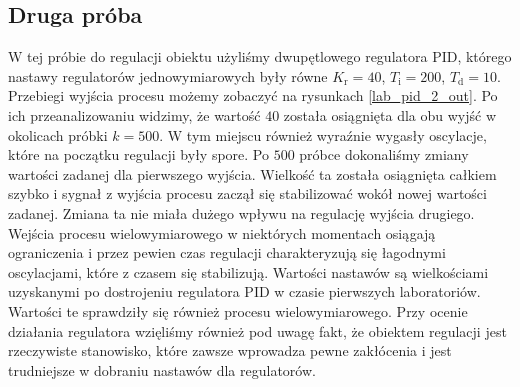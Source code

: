 \subsection{Druga próba}
\label{thermal_pid_proba_2}
W tej próbie do regulacji obiektu użyliśmy dwupętlowego regulatora PID, którego nastawy regulatorów jednowymiarowych były równe $K_{\mathrm{r}} = 40$, $T_{\mathrm{i}} = 200$, $ T_{\mathrm{d}} = 10$. Przebiegi wyjścia procesu możemy zobaczyć na rysunkach \ref{lab_pid_2_out}. Po ich przeanalizowaniu widzimy, że wartość $40$ została osiągnięta dla obu wyjść w okolicach próbki $k=500$. W tym miejscu również wyraźnie wygasły oscylacje, które na początku regulacji były spore. Po $500$ próbce dokonaliśmy zmiany wartości zadanej dla pierwszego wyjścia. Wielkość ta została osiągnięta całkiem szybko i sygnał z wyjścia procesu zaczął się stabilizować wokół nowej wartości zadanej. Zmiana ta nie miała dużego wpływu na regulację wyjścia drugiego. Wejścia procesu wielowymiarowego w niektórych momentach osiągają ograniczenia i przez pewien czas regulacji charakteryzują się łagodnymi oscylacjami, które z czasem się stabilizują. Wartości nastawów są wielkościami uzyskanymi po dostrojeniu regulatora PID w czasie pierwszych laboratoriów. Wartości te sprawdziły się również procesu wielowymiarowego. Przy ocenie działania regulatora wzięliśmy również pod uwagę fakt, że obiektem regulacji jest rzeczywiste stanowisko, które zawsze wprowadza pewne zakłócenia i jest trudniejsze w dobraniu nastawów dla regulatorów. 


